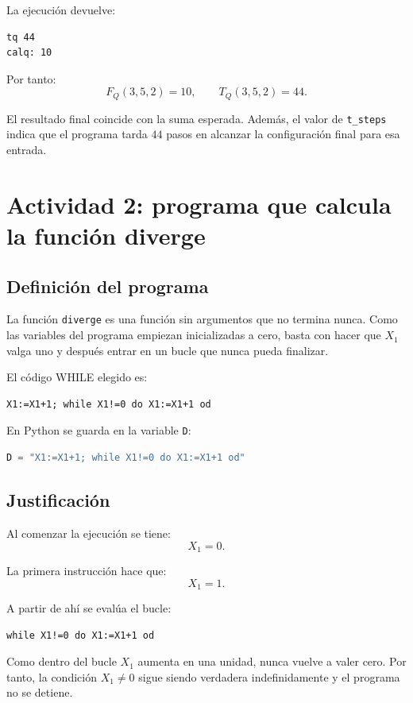 \documentclass[11pt,a4paper]{article}
\begin{document}
La ejecución devuelve:

\begin{lstlisting}
tq 44
calq: 10
\end{lstlisting}

Por tanto:
\[
F_Q(3,5,2)=10,
\qquad
T_Q(3,5,2)=44.
\]

El resultado final coincide con la suma esperada. Además, el valor de \texttt{t\_steps} indica que el programa tarda $44$ pasos en alcanzar la configuración final para esa entrada.

\section{Actividad 2: programa que calcula la función diverge}

\subsection{Definición del programa}
La función \texttt{diverge} es una función sin argumentos que no termina nunca. Como las variables del programa empiezan inicializadas a cero, basta con hacer que $X_1$ valga uno y después entrar en un bucle que nunca pueda finalizar.

El código WHILE elegido es:

\begin{lstlisting}
X1:=X1+1; while X1!=0 do X1:=X1+1 od
\end{lstlisting}

En Python se guarda en la variable \texttt{D}:

\begin{lstlisting}[language=Python]
D = "X1:=X1+1; while X1!=0 do X1:=X1+1 od"
\end{lstlisting}

\subsection{Justificación}
Al comenzar la ejecución se tiene:
\[
X_1=0.
\]

La primera instrucción hace que:
\[
X_1=1.
\]

A partir de ahí se evalúa el bucle:

\begin{lstlisting}
while X1!=0 do X1:=X1+1 od
\end{lstlisting}

Como dentro del bucle $X_1$ aumenta en una unidad, nunca vuelve a valer cero. Por tanto, la condición $X_1\neq 0$ sigue siendo verdadera indefinidamente y el programa no se detiene.
\end{document}
